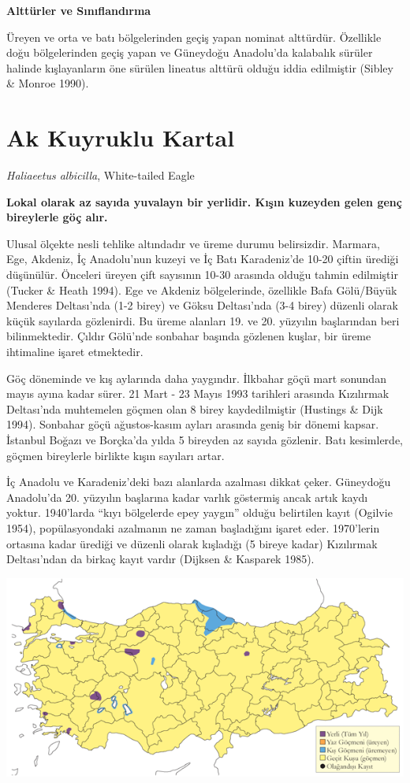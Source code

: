 \documentclass[
  letterpaper,
  DIV=11,
  numbers=noendperiod]{scrreprt}
\begin{document}
\textbf{Alttürler ve Sınıflandırma}

Üreyen ve orta ve batı bölgelerinden geçiş yapan nominat alttürdür.
Özellikle doğu bölgelerinden geçiş yapan ve Güneydoğu Anadolu'da
kalabalık sürüler halinde kışlayanların öne sürülen lineatus alttürü
olduğu iddia edilmiştir (Sibley \& Monroe 1990).

\section{Ak Kuyruklu Kartal}\label{ak-kuyruklu-kartal}

\emph{Haliaeetus albicilla}, White-tailed Eagle

\textbf{Lokal olarak az sayıda yuvalayn bir yerlidir. Kışın kuzeyden
gelen genç bireylerle göç alır.}

Ulusal ölçekte nesli tehlike altındadır ve üreme durumu belirsizdir.
Marmara, Ege, Akdeniz, İç Anadolu'nun kuzeyi ve İç Batı Karadeniz'de
10-20 çiftin ürediği düşünülür. Önceleri üreyen çift sayısının 10-30
arasında olduğu tahmin edilmiştir (Tucker \& Heath 1994). Ege ve Akdeniz
bölgelerinde, özellikle Bafa Gölü/Büyük Menderes Deltası'nda (1-2 birey)
ve Göksu Deltası'nda (3-4 birey) düzenli olarak küçük sayılarda
gözlenirdi. Bu üreme alanları 19. ve 20. yüzyılın başlarından beri
bilinmektedir. Çıldır Gölü'nde sonbahar başında gözlenen kuşlar, bir
üreme ihtimaline işaret etmektedir.

Göç döneminde ve kış aylarında daha yaygındır. İlkbahar göçü mart
sonundan mayıs ayına kadar sürer. 21 Mart - 23 Mayıs 1993 tarihleri
arasında Kızılırmak Deltası'nda muhtemelen göçmen olan 8 birey
kaydedilmiştir (Hustings \& Dijk 1994). Sonbahar göçü ağustos-kasım
ayları arasında geniş bir dönemi kapsar. İstanbul Boğazı ve Borçka'da
yılda 5 bireyden az sayıda gözlenir. Batı kesimlerde, göçmen bireylerle
birlikte kışın sayıları artar.

İç Anadolu ve Karadeniz'deki bazı alanlarda azalması dikkat çeker.
Güneydoğu Anadolu'da 20. yüzyılın başlarına kadar varlık göstermiş ancak
artık kaydı yoktur. 1940'larda ``kıyı bölgelerde epey yaygın'' olduğu
belirtilen kayıt (Ogilvie 1954), popülasyondaki azalmanın ne zaman
başladığını işaret eder. 1970'lerin ortasına kadar ürediği ve düzenli
olarak kışladığı (5 bireye kadar) Kızılırmak Deltası'ndan da birkaç
kayıt vardır (Dijksen \& Kasparek 1985).

\includegraphics{images/harita_Page_108.png}
\end{document}

